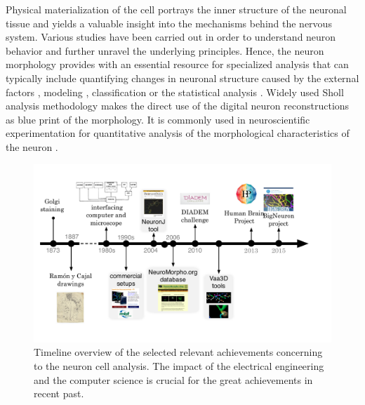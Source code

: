 Physical materialization of the cell portrays the inner structure of the neuronal tissue and yields a valuable insight into the mechanisms behind the nervous system. Various studies have been carried out in order to understand neuron behavior and further unravel the underlying principles. Hence, the neuron morphology provides with an essential resource for specialized analysis that can typically include quantifying changes in neuronal structure caused by the external factors \cite{gomez2007immobilized,koppes2011neurite}, modeling \cite{ascoli2001computer}, classification \cite{armananzas2015towards,defelipe2013new} or the statistical analysis \cite{samsonovich2005statistical}. Widely used Sholl analysis methodology \cite{sholl1953dendritic} makes the direct use of the digital neuron reconstructions as blue print of the morphology. It is commonly used in neuroscientific experimentation for quantitative analysis of the morphological characteristics of the neuron \cite{garcia2014new}. 

\begin{figure}
	\begin{center}
		\includegraphics[width=\textwidth]{ch1_fig1}
	\end{center}
	\caption{Timeline overview of the selected relevant achievements concerning to the neuron cell analysis. The impact of the electrical engineering and the computer science is crucial for the great achievements in recent past.}
	\label{ch1_fig1}
\end{figure}

